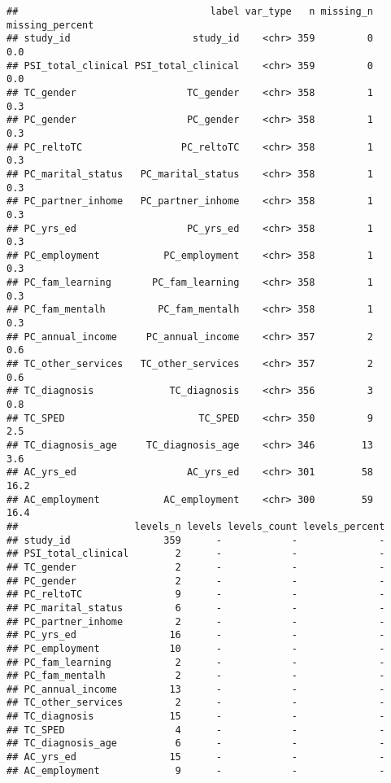 \documentclass[
]{article}
\begin{document}
\begin{verbatim}
##                                 label var_type   n missing_n missing_percent
## study_id                     study_id    <chr> 359         0             0.0
## PSI_total_clinical PSI_total_clinical    <chr> 359         0             0.0
## TC_gender                   TC_gender    <chr> 358         1             0.3
## PC_gender                   PC_gender    <chr> 358         1             0.3
## PC_reltoTC                 PC_reltoTC    <chr> 358         1             0.3
## PC_marital_status   PC_marital_status    <chr> 358         1             0.3
## PC_partner_inhome   PC_partner_inhome    <chr> 358         1             0.3
## PC_yrs_ed                   PC_yrs_ed    <chr> 358         1             0.3
## PC_employment           PC_employment    <chr> 358         1             0.3
## PC_fam_learning       PC_fam_learning    <chr> 358         1             0.3
## PC_fam_mentalh         PC_fam_mentalh    <chr> 358         1             0.3
## PC_annual_income     PC_annual_income    <chr> 357         2             0.6
## TC_other_services   TC_other_services    <chr> 357         2             0.6
## TC_diagnosis             TC_diagnosis    <chr> 356         3             0.8
## TC_SPED                       TC_SPED    <chr> 350         9             2.5
## TC_diagnosis_age     TC_diagnosis_age    <chr> 346        13             3.6
## AC_yrs_ed                   AC_yrs_ed    <chr> 301        58            16.2
## AC_employment           AC_employment    <chr> 300        59            16.4
##                    levels_n levels levels_count levels_percent
## study_id                359      -            -              -
## PSI_total_clinical        2      -            -              -
## TC_gender                 2      -            -              -
## PC_gender                 2      -            -              -
## PC_reltoTC                9      -            -              -
## PC_marital_status         6      -            -              -
## PC_partner_inhome         2      -            -              -
## PC_yrs_ed                16      -            -              -
## PC_employment            10      -            -              -
## PC_fam_learning           2      -            -              -
## PC_fam_mentalh            2      -            -              -
## PC_annual_income         13      -            -              -
## TC_other_services         2      -            -              -
## TC_diagnosis             15      -            -              -
## TC_SPED                   4      -            -              -
## TC_diagnosis_age          6      -            -              -
## AC_yrs_ed                15      -            -              -
## AC_employment             9      -            -              -
\end{verbatim}
\end{document}

